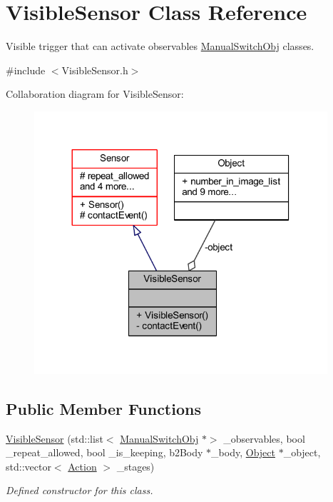 \hypertarget{class_visible_sensor}{}\section{Visible\+Sensor Class Reference}
\label{class_visible_sensor}


Visible trigger that can activate observables \hyperlink{class_manual_switch_obj}{Manual\+Switch\+Obj} classes.  




{\ttfamily \#include $<$Visible\+Sensor.\+h$>$}



Collaboration diagram for Visible\+Sensor\+:\nopagebreak
\begin{figure}[H]
\begin{center}
\leavevmode
\includegraphics[width=308pt]{class_visible_sensor__coll__graph}
\end{center}
\end{figure}
\subsection*{Public Member Functions}
\begin{DoxyCompactItemize}
\item 
\hyperlink{class_visible_sensor_a74f292ee517c8a41afe163cef670c707}{Visible\+Sensor} (std\+::list$<$ \hyperlink{class_manual_switch_obj}{Manual\+Switch\+Obj} $\ast$$>$ \+\_\+observables, bool \+\_\+repeat\+\_\+allowed, bool \+\_\+is\+\_\+keeping, b2\+Body $\ast$\+\_\+body, \hyperlink{class_object}{Object} $\ast$\+\_\+object, std\+::vector$<$ \hyperlink{_manual_switch_obj_8h_a8bb1ef53467e4f61410d12822d922498}{Action} $>$ \+\_\+stages)
\begin{DoxyCompactList}\small\item\em Defined constructor for this class. \end{DoxyCompactList}\end{DoxyCompactItemize}
